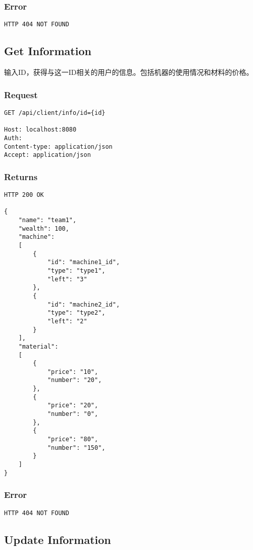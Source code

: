 \documentclass{article}
\begin{document}
\subsubsection*{Error}
\begin{lstlisting}
HTTP 404 NOT FOUND
\end{lstlisting}

\subsection{Get Information}

输入ID，获得与这一ID相关的用户的信息。包括机器的使用情况和材料的价格。

\subsubsection*{Request}
\begin{lstlisting}
GET /api/client/info/id={id}

Host: localhost:8080
Auth:
Content-type: application/json
Accept: application/json
\end{lstlisting}

\subsubsection*{Returns}
\begin{lstlisting}
HTTP 200 OK

{
    "name": "team1",
    "wealth": 100,
    "machine":
    [
        {
            "id": "machine1_id",
            "type": "type1",
            "left": "3"
        },
        {
            "id": "machine2_id",
            "type": "type2",
            "left": "2"
        }
    ],
    "material":
    [
        {
            "price": "10",
            "number": "20",
        },
        {
            "price": "20",
            "number": "0",
        },
        {
            "price": "80",
            "number": "150",
        }
    ]
}
\end{lstlisting}

\subsubsection*{Error}
\begin{lstlisting}
HTTP 404 NOT FOUND
\end{lstlisting}

\subsection{Update Information}
\end{document}
